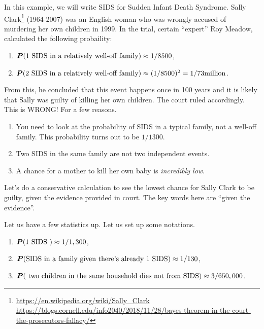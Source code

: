 \begin{example}
    In this example, we will write SIDS for Sudden Infant Death Syndrome.
    Sally Clark\footnote{\url{https://en.wikipedia.org/wiki/Sally_Clark}\\ \url{https://blogs.cornell.edu/info2040/2018/11/28/bayes-theorem-in-the-court-the-prosecutors-fallacy/}} (1964-2007) was an English woman who was wrongly accused of
    murdering her own children in 1999. 
    In the trial, certain ``expert'' Roy Meadow, calculated the following probaility:
    \begin{enumerate}
        \item $\P(\text{1 SIDS in a relatively well-off family}) \approx 1/8500$,
        \item $\P(\text{2 SIDS in a relatively well-off family}) \approx  (1/8500)^2 = 1/73 \text{million}$.
    \end{enumerate}
    From this, he concluded that this event happens once in 100 years and it is likely that Sally was guilty of killing her own children.
    The court ruled accordingly.
    This is WRONG! For a few reasons.

    \begin{enumerate}
        \item You need to look at the probability of SIDS in a typical family, not a well-off family.
            This probability turns out to be $1/1300$.
        \item Two SIDS in the same family are not two independent events.
        \item A chance for a mother to kill her own baby is \emph{incredibly low}.
    \end{enumerate}
    Let's do a conservative calculation to see the lowest chance for Sally Clark to be guilty, given the evidence provided in court.
    The key words here are ``given the evidence''.

    Let us have a few statistics up.
    Let us set up some notations.
    \begin{enumerate}
        \item $\P(\text{1 SIDS }) \approx 1/1,300$,
        \item $\P(\text{SIDS in a  family given there's already 1 SIDS}) \approx 1/130$,
        \item $\P( \text{ two children in the same household dies not from SIDS}) \approx 3/650,000$.
    \end{enumerate}


\end{example}
